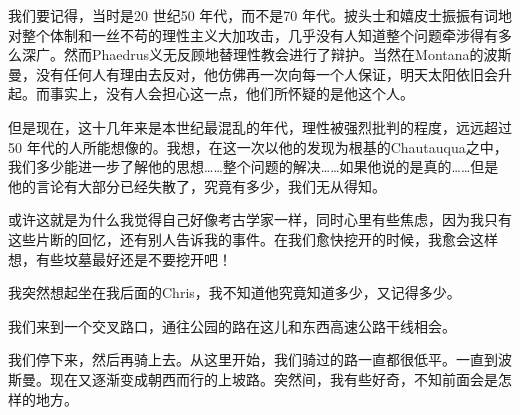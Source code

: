 \documentclass[UTF8]{article}
\begin{document}
\par 我们要记得，当时是20 世纪50 年代，而不是70 年代。披头士和嬉皮士振振有词地对整个体制和一丝不苟的理性主义大加攻击，几乎没有人知道整个问题牵涉得有多么深广。然而Phaedrus义无反顾地替理性教会进行了辩护。当然在Montana的波斯曼，没有任何人有理由去反对，他仿佛再一次向每一个人保证，明天太阳依旧会升起。而事实上，没有人会担心这一点，他们所怀疑的是他这个人。
\par 但是现在，这十几年来是本世纪最混乱的年代，理性被强烈批判的程度，远远超过50 年代的人所能想像的。我想，在这一次以他的发现为根基的Chautauqua之中，我们多少能进一步了解他的思想……整个问题的解决……如果他说的是真的……但是他的言论有大部分已经失散了，究竟有多少，我们无从得知。
\par 或许这就是为什么我觉得自己好像考古学家一样，同时心里有些焦虑，因为我只有这些片断的回忆，还有别人告诉我的事件。在我们愈快挖开的时候，我愈会这样想，有些坟墓最好还是不要挖开吧！
\par 我突然想起坐在我后面的Chris，我不知道他究竟知道多少，又记得多少。
\par 我们来到一个交叉路口，通往公园的路在这儿和东西高速公路干线相会。
\par 我们停下来，然后再骑上去。从这里开始，我们骑过的路一直都很低平。一直到波斯曼。现在又逐渐变成朝西而行的上坡路。突然间，我有些好奇，不知前面会是怎样的地方。
\end{document}
